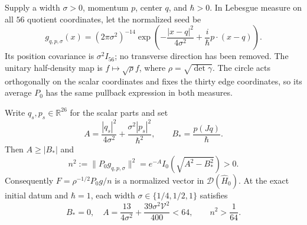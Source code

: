 Supply a width \(\sigma>0\), momentum \(p\), center \(q\), and
\(\hbar>0\). In Lebesgue measure on all \(56\) quotient coordinates,
let the normalized seed be
\begin{equation}
 g_{q,p,\sigma}(x)=(2\pi\sigma^2)^{-14}
 \exp\!\left(-\frac{|x-q|^2}{4\sigma^2}
                  +\frac{i}{\hbar}p\cdot(x-q)\right).
 \label{eq:whitney-packet-seed}
\end{equation}
Its position covariance is \(\sigma^2I_{56}\); no transverse direction
has been removed. The unitary half-density map is
\(f\mapsto\sqrt\rho f\), where \(\rho=\sqrt{\det\gamma}\).
The circle acts orthogonally on the scalar coordinates and fixes the thirty
edge coordinates, so its average \(P_0\) has the same pullback expression
in both measures.

\begin{proposition}
\label{prop:whitney-packet-neutral-projection}
Write \(q_s,p_s\in\mathbb R^{26}\) for the scalar parts and set
\begin{equation}
 A=\frac{|q_s|^2}{4\sigma^2}+\frac{\sigma^2|p_s|^2}{\hbar^2},
 \qquad B_*=\frac{p(Jq)}{\hbar}.
 \label{eq:whitney-packet-overlap-parameters}
\end{equation}
Then \(A\geq|B_*|\) and
\begin{equation}
 n^2:=\|P_0g_{q,p,\sigma}\|^2
 =e^{-A}I_0\!\left(\sqrt{A^2-B_*^2}\right)>0.
 \label{eq:whitney-packet-neutral-norm}
\end{equation}
Consequently \(F=\rho^{-1/2}P_0g/n\) is a normalized vector in
\(\mathcal D(\widehat H_0)\). At the exact initial datum and
\(\hbar=1\), each width \(\sigma\in\{1/4,1/2,1\}\) satisfies
\begin{equation}
 B_*=0,\quad
 A=\frac{13}{4\sigma^2}+\frac{39\sigma^2\mathcal V^2}{400}<64,
 \qquad n^2>\frac1{64}.
 \label{eq:whitney-packet-initial-projection-bound}
\end{equation}
\end{proposition}
